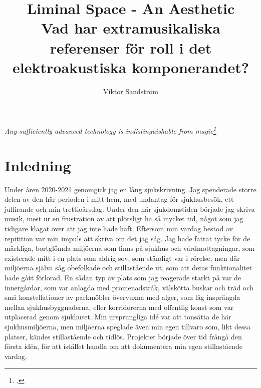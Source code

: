 \documentclass{article}
\title{%
	Liminal Space - An Aesthetic \\
	\large{Vad har extramusikaliska referenser för roll i det elektroakustiska komponerandet?}
}
\author{Viktor Sandström}
\begin{document}
\maketitle
\newpage
\tableofcontents
\newpage



\begin{center}
	\hspace{0pt}
	\vfill
	\emph{Any sufficiently advanced technology is indistinguishable from magic\footcite{ArthurCClarkeMagic}}
	\vfill
	\hspace{0pt}
\end{center}
\newpage

\section{Inledning}
Under åren 2020-2021 genomgick jag en lång sjukskrivning. Jag spenderade större delen av den här perioden i
mitt hem, med undantag för sjukhusbesök, ett julfirande och min trettioårsdag. Under den här sjukdomstiden
började jag skriva musik, mest ur en frustration av att plötsligt ha så mycket tid, något som jag
tidigare klagat över att jag inte hade haft. Eftersom min vardag bestod av repitition var min impuls att
skriva om det jag såg. Jag hade fattat tycke för de märkliga, bortglömda miljöerna som finns på sjukhus och
vårdmottagningar, som existerade mitt i en plats som aldrig sov, som ständigt var i rörelse, men där miljöerna
själva såg obefolkade och stillastående ut, som att deras funktionalitet hade gått förlorad. En sådan typ av
plats som jag reagerade starkt på var de innergårdar, som var anlagda med promenadstråk, välskötta buskar
och träd och små konstellationer av parkmöbler övervuxna med alger, som låg insprängda mellan
sjukhusbyggnaderna, eller korridorerna med offentlig konst som var utplacerad genom sjukhuset. Min
ursprungliga idé var att tonsätta de här sjukhusmiljöerna, men miljöerna speglade även min egen tillvaro som,
likt dessa platser, kändes stillastående och tidlös. Projektet började över tid frångå den första idén, för
att istället handla om att dokumentera min egen stillastående vardag.
\end{document}
